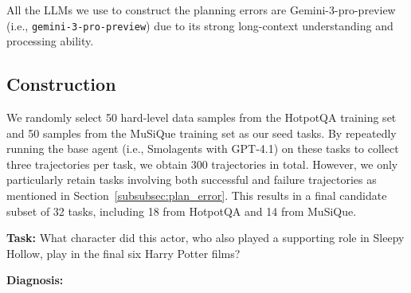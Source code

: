 All the LLMs we use to construct the planning errors are Gemini-3-pro-preview (i.e., \texttt{gemini-3-pro-preview}) due to its strong long-context understanding and processing ability.

\subsection{Construction}
We randomly select 50 hard-level data samples from the HotpotQA \citep{yang2018hotpotqa} training set and 50 samples from the MuSiQue \citep{trivedi2022musique} training set as our seed tasks. By repeatedly running the base agent (i.e., Smolagents with GPT-4.1) on these tasks to collect three trajectories per task, we obtain 300 trajectories in total. However, we only particularly retain tasks involving both successful and failure trajectories as mentioned in Section~\ref{subsubsec:plan_error}. This results in a final candidate subset of 32 tasks, including 18 from HotpotQA and 14 from MuSiQue.


\begin{tcolorbox}[
    colback=gray!5,
    colframe=gray!50!black,
    title=\textbf{Example Diagnosis from HotpotQA},
    fonttitle=\bfseries,
    breakable
]

\textbf{Task:} What character did this actor, who also played a supporting role in Sleepy Hollow, play in the final six Harry Potter films?

\tcbline

\textbf{Diagnosis:}
\vspace{-8pt}

\begin{description}[
    leftmargin=0.0em, 
    font=\bfseries\itshape, 
    itemsep=-0.5em        
]
    
    
    

\end{description}

\end{tcolorbox}



